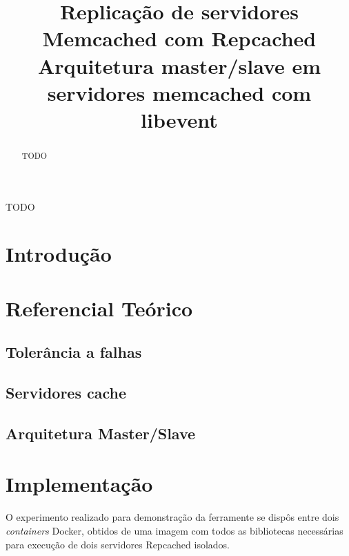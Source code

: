 \documentclass[conference]{IEEEtran}
\begin{document}
\title{Replicação de servidores Memcached com Repcached\\
{\footnotesize Arquitetura master/slave em servidores memcached com libevent}
}


\author{
}

\maketitle

\begin{abstract}
TODO
\end{abstract}

\begin{IEEEkeywords}
TODO
\end{IEEEkeywords}

\section{Introdução}

\section{Referencial Teórico}

\subsection{Tolerância a falhas}

\subsection{Servidores cache}

\subsection{Arquitetura Master/Slave}

\section{Implementação}

O experimento realizado para demonstração da ferramente se dispôs entre dois \textit{containers} Docker\cite{docker}, obtidos de uma imagem com todos as bibliotecas necessárias para execução de dois servidores Repcached \cite{repcached} isolados.
\end{document}
